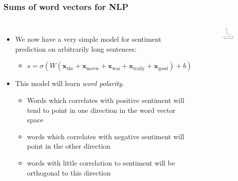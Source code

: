 \documentclass{beamer}
\renewcommand{\vec}[1]{{\boldsymbol{#1}}}
\newcommand{\svec}[2]{{\vec{#1}_{#2}}}
\begin{document}
  \begin{frame}
    \frametitle{Sums of word vectors for NLP}

\begin{columns}
    \begin{itemize}
    \item We now have a very simple model for sentiment prediction on arbitrarily long sentences:
      \begin{itemize}
      \item $s = \sigma( W (\svec{x}{\text{the}}+\svec{x}{\text{movie}}+\svec{x}{\text{was}}+\svec{x}{\text{really}}+\svec{x}{\text{good}}) + b)$
      \end{itemize}
    \item This model will learn \emph{word polarity}.
      \begin{itemize}
      \item Words which correlates with positive sentiment will tend to point in one direction in the word vector space
      \item words which correlates with negative sentiment will point in the other direction
        \item words with little correlation to sentiment will be orthogonal to this direction
      \end{itemize}
    \end{itemize}
        \begin{figure}
\includegraphics[scale=0.3]{sentiment_analysis_word_vectors}
        \end{figure}
\end{columns}
  \end{frame}
\end{document}

